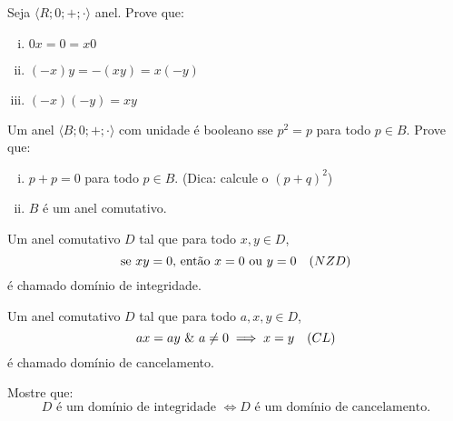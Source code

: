 \begin{exercise}
Seja $\langle R;0;+;\cdot \rangle$ anel. Prove que:
\begin{enumerate}[(i)]
    \item $0x = 0 = x0$
    \item $(-x)y = -(xy) = x(-y)$
    \item $(-x)(-y) = xy$
\end{enumerate} 
\end{exercise}

\begin{exercise}
Um anel $\langle B;0;+;\cdot \rangle$ com unidade é booleano sse $p^2=p$ para todo $p \in B$. Prove que:
\begin{enumerate}[(i)]
    \item $p + p = 0$ para todo $p \in B$. (Dica: calcule o $(p + q)^2$)
    \item $B$ é um anel comutativo.
\end{enumerate}
\end{exercise}

\begin{definition}
Um anel comutativo $D$ tal que para todo $x,y \in D$,
$$
    \text{se } xy = 0 \text{, então } x = 0 \text{ ou } y = 0 \quad \text(NZD)
$$
é chamado domínio de integridade.
\end{definition}

\begin{definition}
Um anel comutativo $D$ tal que para todo $a,x,y \in D$,
$$
    ax = ay \text{ \& } a \not = 0 \implies x = y \quad \text(CL)
$$
é chamado domínio de cancelamento.
\end{definition}

\begin{exercise}
Mostre que:
$$
    D \text{ é um domínio de integridade } \iff D \text { é um domínio de cancelamento}.
$$ 
\end{exercise}
